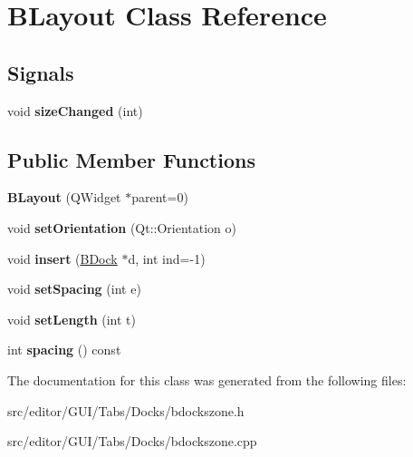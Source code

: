 \hypertarget{class_b_layout}{\section{\-B\-Layout \-Class \-Reference}
\label{class_b_layout}
}
\subsection*{\-Signals}
\begin{DoxyCompactItemize}
\item 
\hypertarget{class_b_layout_a9e27eb42d23daea4491e31dc65cde9bd}{void {\bfseries size\-Changed} (int)}\label{class_b_layout_a9e27eb42d23daea4491e31dc65cde9bd}

\end{DoxyCompactItemize}
\subsection*{\-Public \-Member \-Functions}
\begin{DoxyCompactItemize}
\item 
\hypertarget{class_b_layout_aaa40bac25828f412e0c9f0295143222a}{{\bfseries \-B\-Layout} (\-Q\-Widget $\ast$parent=0)}\label{class_b_layout_aaa40bac25828f412e0c9f0295143222a}

\item 
\hypertarget{class_b_layout_a15af3c6623f5e820b011a237bd896fa5}{void {\bfseries set\-Orientation} (\-Qt\-::\-Orientation o)}\label{class_b_layout_a15af3c6623f5e820b011a237bd896fa5}

\item 
\hypertarget{class_b_layout_ad950c8e9f332986e6367081528de88d6}{void {\bfseries insert} (\hyperlink{class_b_dock}{\-B\-Dock} $\ast$d, int ind=-\/1)}\label{class_b_layout_ad950c8e9f332986e6367081528de88d6}

\item 
\hypertarget{class_b_layout_a2c129fc7bb433119b460eceac0540f85}{void {\bfseries set\-Spacing} (int e)}\label{class_b_layout_a2c129fc7bb433119b460eceac0540f85}

\item 
\hypertarget{class_b_layout_a59a4b4faeeac67c8260f4dd302ff3a66}{void {\bfseries set\-Length} (int t)}\label{class_b_layout_a59a4b4faeeac67c8260f4dd302ff3a66}

\item 
\hypertarget{class_b_layout_ac9a46249e19b37a07f049751df3ef391}{int {\bfseries spacing} () const }\label{class_b_layout_ac9a46249e19b37a07f049751df3ef391}

\end{DoxyCompactItemize}


\-The documentation for this class was generated from the following files\-:\begin{DoxyCompactItemize}
\item 
src/editor/\-G\-U\-I/\-Tabs/\-Docks/bdockszone.\-h\item 
src/editor/\-G\-U\-I/\-Tabs/\-Docks/bdockszone.\-cpp\end{DoxyCompactItemize}
